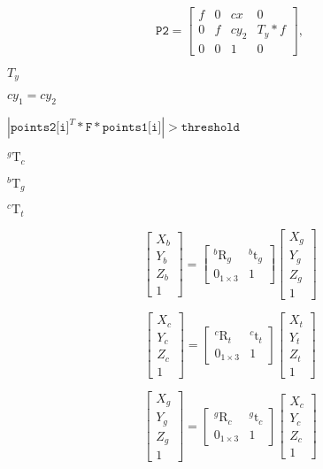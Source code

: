 \documentclass{article}
\begin{document}
\[\texttt{P2} = \begin{bmatrix} f & 0 & cx & 0 \\ 0 & f & cy_2 & T_y*f \\ 0 & 0 & 1 & 0 \end{bmatrix},\]
\pagebreak

$T_y$
\pagebreak

$cy_1=cy_2$
\pagebreak

$|\texttt{points2[i]}^T*\texttt{F}*\texttt{points1[i]}|>\texttt{threshold}$
\pagebreak

$_{}^{g}\textrm{T}_c$
\pagebreak

$_{}^{b}\textrm{T}_g$
\pagebreak

$_{}^{c}\textrm{T}_t$
\pagebreak

\[ \begin{bmatrix} X_b\\ Y_b\\ Z_b\\ 1 \end{bmatrix} = \begin{bmatrix} _{}^{b}\textrm{R}_g & _{}^{b}\textrm{t}_g \\ 0_{1 \times 3} & 1 \end{bmatrix} \begin{bmatrix} X_g\\ Y_g\\ Z_g\\ 1 \end{bmatrix} \]
\pagebreak

\[ \begin{bmatrix} X_c\\ Y_c\\ Z_c\\ 1 \end{bmatrix} = \begin{bmatrix} _{}^{c}\textrm{R}_t & _{}^{c}\textrm{t}_t \\ 0_{1 \times 3} & 1 \end{bmatrix} \begin{bmatrix} X_t\\ Y_t\\ Z_t\\ 1 \end{bmatrix} \]
\pagebreak

\[ \begin{bmatrix} X_g\\ Y_g\\ Z_g\\ 1 \end{bmatrix} = \begin{bmatrix} _{}^{g}\textrm{R}_c & _{}^{g}\textrm{t}_c \\ 0_{1 \times 3} & 1 \end{bmatrix} \begin{bmatrix} X_c\\ Y_c\\ Z_c\\ 1 \end{bmatrix} \]
\pagebreak
\end{document}
